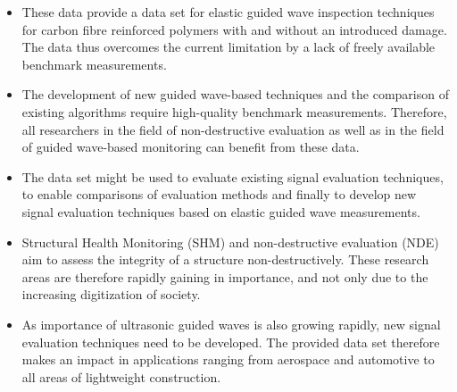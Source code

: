 \documentclass[times,final]{elsarticle}
\begin{document}

\begin{itemize}
\itemsep=0pt
\parsep=0pt
    \item These data provide a data set for elastic guided wave inspection techniques for carbon fibre reinforced polymers with and without an introduced damage. The data thus overcomes the current limitation by a lack of freely available benchmark measurements.
    \item The development of new guided wave-based techniques and the comparison of existing algorithms require high-quality benchmark measurements. Therefore, all researchers in the field of non-destructive evaluation as well as in the field of guided wave-based monitoring can benefit from these data.
    \item The data set might be used to evaluate existing signal evaluation techniques, to enable comparisons of evaluation methods and finally to develop new signal evaluation techniques based on elastic guided wave measurements.
    \item Structural Health Monitoring (SHM) and non-destructive evaluation (NDE) aim to assess the integrity of a structure non-destructively. These research areas are therefore rapidly gaining in importance, and not only due to the increasing digitization of society.
    \item As importance of ultrasonic guided waves is also growing rapidly, new signal evaluation techniques need to be developed. The provided data set therefore makes an impact in applications ranging from aerospace and automotive to all areas of lightweight construction.
\end{itemize}
\end{document}
